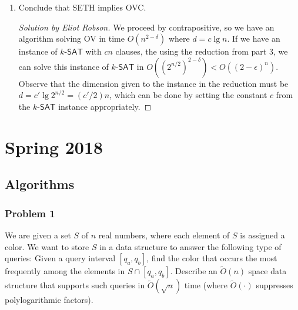 \documentclass{article}
\newenvironment{solution}[1]{\begin{proof}[Solution by #1]}{\end{proof}}
\newcommand{\poly}{\mathsf{poly}}
\newcommand{\SAT}{\mathsf{SAT}}
\newcommand{\OTilde}{\widetilde{O}}
\begin{document}
\begin{enumerate}
\begin{solution}{Eliot Robson}
        Finally, to see the desired runtime, observe that we can compute the entries for \(y_a\) and \(z_b\) in \(O(\poly(m))\) time (since we can check if a clause is satisfied by an assignment in constant time, treating \(a\) and \(b\) as the same here), and there are \(2^{n/2}\) possible assignments.
        
    \end{solution}
    
    \item Conclude that SETH implies OVC.
    
    \begin{solution}{Eliot Robson}
        We proceed by contrapositive, so we have an algorithm solving OV in time \(O(n^{2 - \delta})\) where \(d = c \lg n\). If we have an instance of \(k\)-\(\SAT\) with \(cn\) clauses, the using the reduction from part 3, we can solve this instance of \(k\)-\(\SAT\) in \(O((2^{n/2})^{2 - \delta}) < O((2 - \epsilon)^n)\). Observe that the dimension given to the instance in the reduction must be \(d = c' \lg 2^{n/2} = (c'/2) n\), which can be done by setting the constant \(c\) from the \(k\)-\(\SAT\) instance appropriately.
    \end{solution}
\end{enumerate}

\section{Spring 2018}

\subsection{Algorithms}

\subsubsection{Problem 1}
We are given a set \(S\) of \(n\) real numbers, where each element of \(S\) is assigned a color. We want to store \(S\) in a data structure to answer the following type of queries: Given a query interval \([q_a, q_b]\), find the color that occurs the most frequently among the elements in \(S \cap [q_a, q_b]\). Describe an \(\OTilde(n)\) space data structure that supports such queries in \(\OTilde(\sqrt{n})\) time (where \(\OTilde(\cdot)\) suppresses polylogarithmic factors). %
\end{document}
